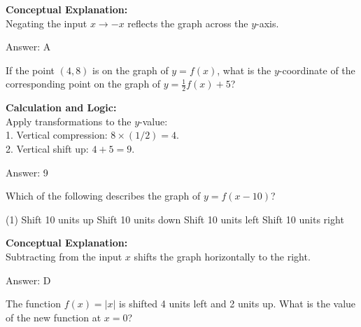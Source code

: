 \documentclass[11pt,paper=a4,answers]{exam}
\begin{document}
\begin{questions}
\begin{solution}
\textbf{Conceptual Explanation:} \\
Negating the input $x \rightarrow -x$ reflects the graph across the $y$-axis.

\vspace{25pt}

Answer: \colorbox{yellow!100}{A}
\end{solution}

\vspace{40pt}

\question
If the point $(4, 8)$ is on the graph of $y = f(x)$, what is the $y$-coordinate of the corresponding point on the graph of $y = \frac{1}{2}f(x) + 5$?

\begin{solution}
\textbf{Calculation and Logic:} \\
Apply transformations to the $y$-value: \\
1. Vertical compression: $8 \times (1/2) = 4$. \\
2. Vertical shift up: $4 + 5 = 9$.

\vspace{25pt}

Answer: \colorbox{yellow!100}{9}
\end{solution}

\vspace{40pt}

\question
Which of the following describes the graph of $y = f(x-10)$?
\begin{tasks}(1)
    \task Shift 10 units up
    \task Shift 10 units down
    \task Shift 10 units left
    \task Shift 10 units right
\end{tasks}

\begin{solution}
\textbf{Conceptual Explanation:} \\
Subtracting from the input $x$ shifts the graph horizontally to the right.

\vspace{25pt}

Answer: \colorbox{yellow!100}{D}
\end{solution}

\vspace{40pt}

\question
The function $f(x) = |x|$ is shifted 4 units left and 2 units up. What is the value of the new function at $x = 0$?


\end{questions}
\end{document}
